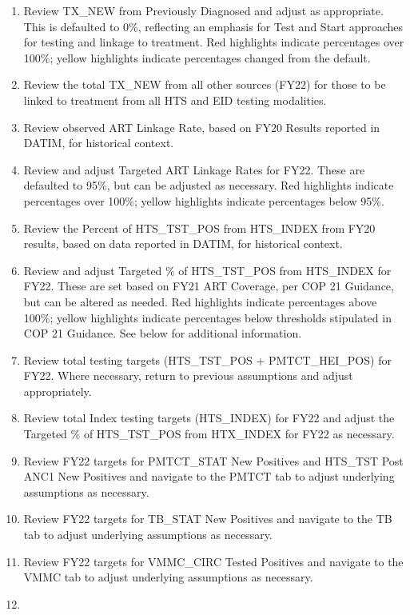 \documentclass[
  openany]{book}
\begin{document}
\begin{enumerate}
\def\labelenumi{\arabic{enumi}.}
\item
  Review TX\_NEW from Previously Diagnosed and adjust as appropriate.
  This is defaulted to 0\%, reflecting an emphasis for Test and Start
  approaches for testing and linkage to treatment. Red highlights
  indicate percentages over 100\%; yellow highlights indicate
  percentages changed from the default.
\item
  Review the total TX\_NEW from all other sources (FY22) for those to
  be linked to treatment from all HTS and EID testing modalities.
\item
  Review observed ART Linkage Rate, based on FY20 Results reported in
  DATIM, for historical context.
\item
  Review and adjust Targeted ART Linkage Rates for FY22. These are
  defaulted to 95\%, but can be adjusted as necessary. Red highlights
  indicate percentages over 100\%; yellow highlights indicate
  percentages below 95\%.
\item
  Review the Percent of HTS\_TST\_POS from HTS\_INDEX from FY20 results,
  based on data reported in DATIM, for historical context.
\item
  Review and adjust Targeted \% of HTS\_TST\_POS from HTS\_INDEX for FY22.
  These are set based on FY21 ART Coverage, per COP 21 Guidance, but
  can be altered as needed. Red highlights indicate percentages above
  100\%; yellow highlights indicate percentages below thresholds
  stipulated in COP 21 Guidance. See below for additional information.
\item
  Review total testing targets (HTS\_TST\_POS + PMTCT\_HEI\_POS) for FY22.
  Where necessary, return to previous assumptions and adjust
  appropriately.
\item
  Review total Index testing targets (HTS\_INDEX) for FY22 and adjust
  the Targeted \% of HTS\_TST\_POS from HTX\_INDEX for FY22 as necessary.
\item
  Review FY22 targets for PMTCT\_STAT New Positives and HTS\_TST Post
  ANC1 New Positives and navigate to the PMTCT tab to adjust
  underlying assumptions as necessary.
\item
  Review FY22 targets for TB\_STAT New Positives and navigate to the TB
  tab to adjust underlying assumptions as necessary.
\item
  Review FY22 targets for VMMC\_CIRC Tested Positives and navigate to
  the VMMC tab to adjust underlying assumptions as necessary.
\item

\end{enumerate}
\end{document}
